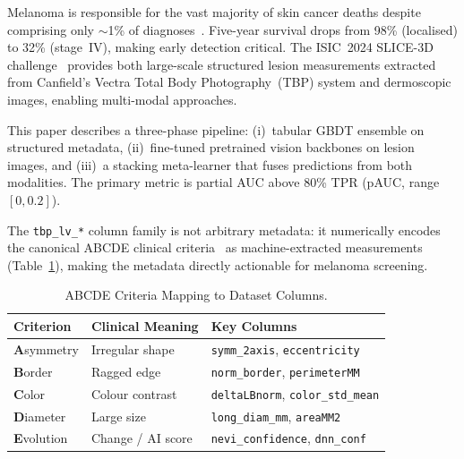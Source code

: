 \documentclass[conference]{IEEEtran}
\begin{document}
Melanoma is responsible for the vast majority of skin cancer deaths
despite comprising only $\sim$1\% of diagnoses~\cite{siegel2024cancer}.
Five-year survival drops from 98\% (localised) to 32\% (stage~IV),
making early detection critical.
The ISIC~2024 SLICE-3D challenge~\cite{isic2024} provides both
large-scale structured lesion measurements extracted from Canfield's
Vectra Total Body Photography~(TBP) system and dermoscopic images,
enabling multi-modal approaches.

This paper describes a three-phase pipeline:
(i)~tabular GBDT ensemble on structured metadata,
(ii)~fine-tuned pretrained vision backbones on lesion images, and
(iii)~a stacking meta-learner that fuses predictions from both modalities.
The primary metric is partial AUC above 80\% TPR (pAUC, range $[0, 0.2]$).

The \texttt{tbp\_lv\_*} column family is not arbitrary metadata:
it numerically encodes the canonical ABCDE clinical criteria~\cite{friedman1985}
as machine-extracted measurements (Table~\ref{tab:abcde}), making
the metadata directly actionable for melanoma screening.

\begin{table}[!t]
  \centering
  \caption{ABCDE Criteria Mapping to Dataset Columns.}
  \label{tab:abcde}
  \renewcommand{\arraystretch}{1.1}
  \begin{tabular}{lll}
    \toprule
    \textbf{Criterion} & \textbf{Clinical Meaning} & \textbf{Key Columns} \\
    \midrule
    \textbf{A}symmetry & Irregular shape & \texttt{symm\_2axis}, \texttt{eccentricity} \\
    \textbf{B}order     & Ragged edge     & \texttt{norm\_border}, \texttt{perimeterMM} \\
    \textbf{C}olor      & Colour contrast & \texttt{deltaLBnorm}, \texttt{color\_std\_mean} \\
    \textbf{D}iameter   & Large size      & \texttt{long\_diam\_mm}, \texttt{areaMM2} \\
    \textbf{E}volution  & Change / AI score & \texttt{nevi\_confidence}, \texttt{dnn\_conf} \\
    \bottomrule
  \end{tabular}
\end{table}
\end{document}
